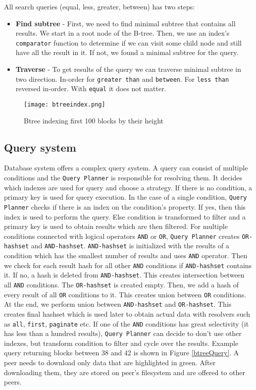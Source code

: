 All search queries (equal, less, greater, between) has two steps:
\begin{itemize}
    \item \textbf{Find subtree} - First, we need to find minimal subtree that contains all results. We start in a root node of the B-tree. Then, we use an index's \texttt{comparator} function to determine if we can visit some child node and still have all the result in it. If not, we found a minimal subtree for the query.
    \item \textbf{Traverse} - To get results of the query we can traverse minimal subtree in two direction. In-order for \texttt{greater than} and \texttt{between}. For \texttt{less than} reversed in-order. With \texttt{equal} it does not matter.
\end{itemize}

\begin{figure}[h]
    \centering
    \texttt{[image: btreeindex.png]}
    \caption{Btree indexing first 100 blocks by their height}
    \label{btree}
\end{figure}

\subsection{Query system}
Database system offers a complex query system. A query can consist of multiple conditions and the \texttt{Query Planner} is responsible for resolving them. It decides which indexes are used for query and choose a strategy. If there is no condition, a primary key is used for query execution. In the case of a single condition, \texttt{Query Planner} checks if there is an index on the condition's property. If yes, then this index is used to perform the query. Else condition is transformed to filter and a primary key is used to obtain results which are then filtered. For multiple conditions connected with logical operators \texttt{AND} or \texttt{OR}, \texttt{Query Planner} creates \texttt{OR-hashset} and \texttt{AND-hashset}. \texttt{AND-hashset} is initialized with the results of a condition which has the smallest number of results and uses \texttt{AND} operator. Then we check for each result hash for all other \texttt{AND} conditions if \texttt{AND-hashset} contains it. If no, a hash is deleted from \texttt{AND-hashset}. This creates intersection between all \texttt{AND} conditions. The \texttt{OR-hashset} is created empty. Then, we add a hash of every result of all \texttt{OR} conditions to it. This creates union between \texttt{OR} conditions. At the end, we perform union between \texttt{AND-hashset} and \texttt{OR-hashset}. This creates final hashset which is used later to obtain actual data with resolvers such as \texttt{all}, \texttt{first}, \texttt{paginate} etc. If one of the \texttt{AND} conditions has great selectivity (it has less than a hundred results), \texttt{Query Planner} can decide to don't use other indexes, but transform condition to filter and cycle over the results. Example query returning blocks between 38 and 42 is shown in Figure \ref{btreeQuery}. A peer needs to download only data that are highlighted in green. After downloading them, they are stored on peer's filesystem and are offered to other peers. 

